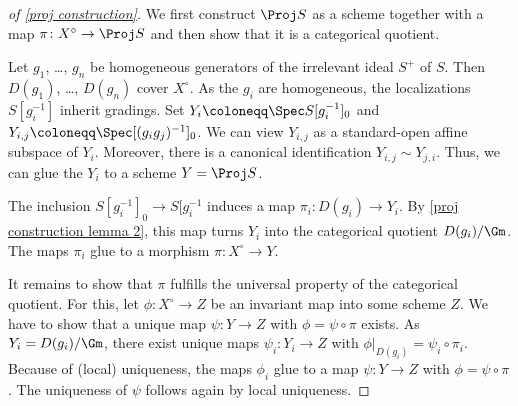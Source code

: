 \begin{proof}[of \cref{proj construction}]
  We first construct $\Proj S$ as a scheme together with a map
  $\pi\colon X^\circ \to \Proj S$ and then show that it is a
  categorical quotient.

  Let $g_1$, \dots, $g_n$ be homogeneous generators of the irrelevant
  ideal $S^+$ of $S$.  Then $D(g_1)$, \dots, $D(g_n)$ cover
  $X^\circ$.  As the $g_i$ are homogeneous, the localizations
  $S[g_i^{-1}]$ inherit gradings.  Set $Y_i \coloneqq \Spec
  S[g_i^{-1}]_0$ and $Y_{i, j} \coloneqq \Spec[(g_i g_j)^{-1}]_0$.  We
  can view $Y_{i,j}$ as a standard-open affine subspace of $Y_i$.
  Moreover, there is a canonical identification $Y_{i,j} \sim
  Y_{j,i}$. Thus, we can glue the $Y_i$ to a scheme $Y = \Proj S$.

  The inclusion $S[g_i^{-1}]_0 \to S[g_i^{-1}$ induces a map
  $\pi_i\colon D(g_i) \to Y_i$.  By \cref{proj construction lemma 2},
  this map turns $Y_i$ into the categorical quotient $D(g_i)/\Gm$.
  The maps $\pi_i$ glue to a morphism $\pi\colon X^\circ \to Y$.

  It remains to show that $\pi$ fulfills the universal property of the
  categorical quotient.  For this, let $\phi\colon X^\circ \to Z$ be
  an invariant map into some scheme $Z$.  We have to show that a
  unique map $\psi\colon Y \to Z$ with $\phi = \psi \circ \pi$
  exists.  As $Y_i = D(g_i)/\Gm$, there exist unique maps
  $\psi_i\colon Y_i \to Z$ with $\phi|_{D(g_i)} = \psi_i \circ
  \pi_i$.  Because of (local) uniqueness, the maps $\phi_i$ glue to a
  map $\psi\colon Y \to Z$ with $\phi = \psi \circ \pi$.  The
  uniqueness of $\psi$ follows again by local uniqueness.
\end{proof}

